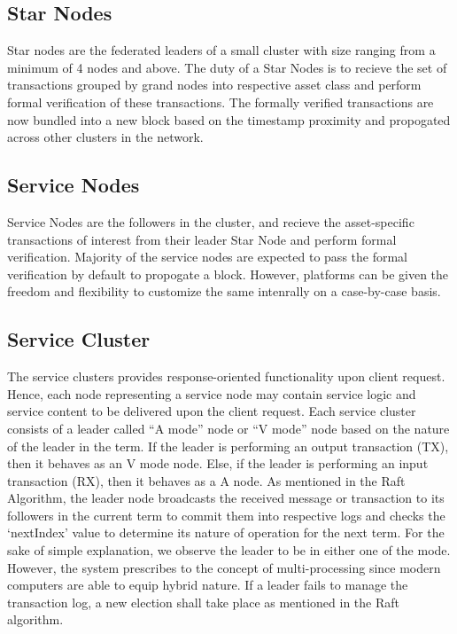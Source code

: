 \documentclass[]{article}
\begin{document}
\subsection{Star Nodes}
Star nodes are the federated leaders of a small cluster with size ranging from a minimum of 4 nodes and above.
The duty of a Star Nodes is to recieve the set of transactions grouped by grand nodes into respective asset class and perform formal verification of these transactions.
The formally verified transactions are now bundled into a new block based on the timestamp proximity and propogated across other clusters in the network. 
\subsection{Service Nodes}
Service Nodes are the followers in the cluster, and recieve the asset-specific transactions of interest from their leader Star Node and perform formal verification. Majority of the service nodes are expected to pass the formal verification by default to propogate a block. However, platforms can be given the freedom and flexibility to customize the same intenrally on a case-by-case basis.

\subsection{Service Cluster}
The service clusters provides response-oriented functionality upon client request. Hence, each node representing a service node may contain service logic and service content to be delivered upon the client request. Each service cluster consists of a leader called “A mode” node or “V mode” node based on the nature of the leader in the term. If the leader is performing an output transaction (TX), then it behaves as an V mode node. Else, if the leader is performing an input transaction (RX), then it behaves as a A node. As mentioned in the Raft Algorithm\cite{ARTICLE:2}, the leader node broadcasts the received message or transaction to its followers in the current term to commit them into respective logs and checks the ‘nextIndex’ value to determine its nature of operation for the next term. For the sake of simple explanation, we observe the leader to be in either one of the mode. However, the system prescribes to the concept of multi-processing since modern computers are able to equip hybrid nature. If a leader fails to manage the transaction log, a new election shall take place as mentioned in the Raft algorithm\cite{ARTICLE:2}.
\end{document}
